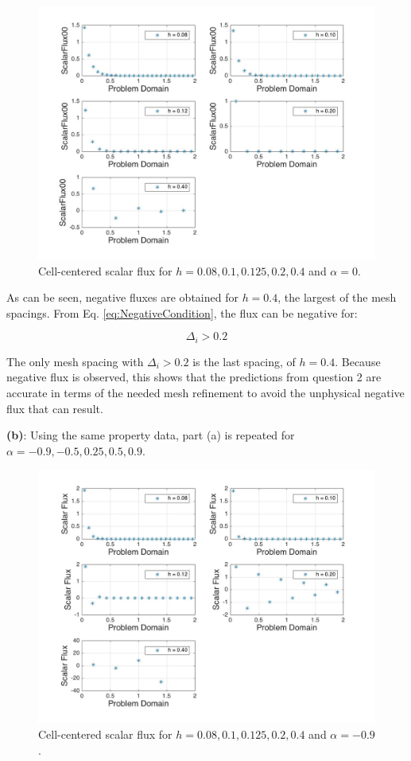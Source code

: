 \documentclass[10pt]{article}
\begin{document}
\begin{figure}[H]
  \centering
  \includegraphics[width=16cm]{ScalarFlux.jpg} %
  \caption{Cell-centered scalar flux for \(h=0.08, 0.1, 0.125, 0.2, 0.4\) and \(\alpha=0\).}
  \label{fig:20}
\end{figure}

As can be seen, negative fluxes are obtained for \(h=0.4\), the largest of the mesh spacings. From Eq. \eqref{eq:NegativeCondition}, the flux can be negative for:

\begin{equation}
\Delta_i>0.2
\end{equation}

The only mesh spacing with \(\Delta_i>0.2\) is the last spacing, of \(h=0.4\). Because negative flux is observed, this shows that the predictions from question 2 are accurate in terms of the needed mesh refinement to avoid the unphysical negative flux that can result.\newline

\textbf{(b)}: Using the same property data, part (a) is repeated for \(\alpha=-0.9, -0.5, 0.25, 0.5, 0.9\). 

\begin{figure}[H]
  \centering
  \includegraphics[width=16cm]{ScalarFlux1-90.jpg} %
  \caption{Cell-centered scalar flux for \(h=0.08, 0.1, 0.125, 0.2, 0.4\) and \(\alpha=-0.9\).}
\end{figure}
\end{document}
